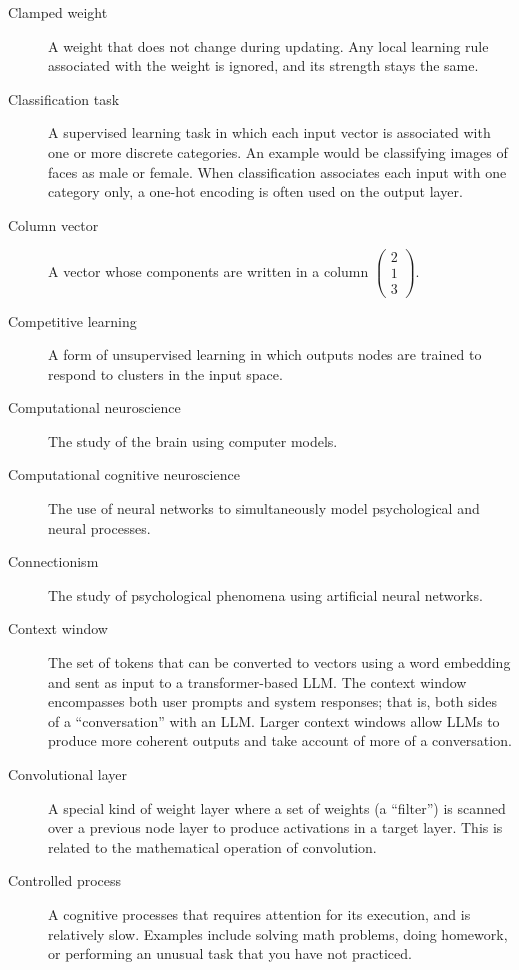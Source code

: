 \begin{description}
\item[Clamped weight] A weight that does not change during updating. Any local learning rule associated with the weight is ignored, and its strength stays the same.

\item[Classification task] A supervised learning task in which each input vector is associated with one or more discrete  categories. An example would be classifying images of faces as male or female. When classification associates each input with one category only, a one-hot encoding is often used on the output layer.

\item[Column vector] A vector whose components are written in a column \eg $\displaystyle \begin{pmatrix} 2 \\ 1 \\ 3 \end{pmatrix}$.

\item[Competitive learning] A form of unsupervised learning in which outputs nodes are trained to respond to clusters in the input space. 

\item[Computational neuroscience] The study of the brain using computer models.

\item[Computational cognitive neuroscience] The use of neural networks to simultaneously model psychological and neural processes.

\item[Connectionism] The study of psychological phenomena using artificial neural networks.

\item[Context window] The set of tokens that can be converted to vectors using a word embedding and sent as input to a transformer-based LLM.  The context window encompasses both user prompts and system responses; that is, both sides of a ``conversation'' with an LLM. Larger context windows allow LLMs to produce more coherent outputs and take account of more of a conversation.

\item[Convolutional layer] A special kind of weight layer where a set of weights (a ``filter'') is scanned over a previous node layer to produce activations in a target layer. This is related to the mathematical operation of convolution.

\item[Controlled process] A cognitive processes that requires attention for its execution, and is relatively slow. Examples include solving math problems, doing homework, or performing an  unusual task that you have not practiced.


\end{description}
